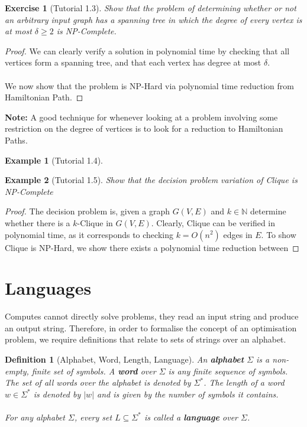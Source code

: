 \documentclass[a4paper,10pt]{article}
\newtheorem{definition}{Definition}
\newtheorem{exercise}{Exercise}
\newtheorem{example}{Example}
\begin{document}
\begin{exercise}[Tutorial 1.3]
    Show that the problem of determining whether or not an arbitrary input graph has a spanning tree in which the degree of every vertex is at most $\delta\geq2$ is NP-Complete.
\end{exercise}
\begin{proof}
    We can clearly verify a solution in polynomial time by checking that all vertices form a spanning tree, and that each vertex has degree at most $\delta$. \\
    \\
    We now show that the problem is NP-Hard via polynomial time reduction from Hamiltonian Path.
\end{proof}
\textbf{Note:} A good technique for whenever looking at a problem involving some restriction on the degree of vertices is to look for a reduction to Hamiltonian Paths.


\begin{example}[Tutorial 1.4]
\end{example}


\begin{example}[Tutorial 1.5] Show that the decision problem variation of Clique is NP-Complete
\end{example}
\begin{proof}
    The decision problem is, given a graph $G(V,E)$ and $k\in\mathbb{N}$ determine whether there is a $k$-Clique in $G(V,E)$. Clearly, Clique can be verified in polynomial time, as it corresponds to checking $k = O(n^2)$ edges in $E$. To show Clique is NP-Hard, we show there exists a polynomial time reduction between
\end{proof}


\newpage
\section{Languages}
Computes cannot directly solve problems, they read an input string and produce an output string. Therefore, in order to formalise the concept of an optimisation problem, we require definitions that relate to sets of strings over an alphabet. 

\begin{definition}[Alphabet, Word, Length, Language]
An \textbf{alphabet} $\Sigma$ is a non-empty, finite set of symbols. A \textbf{word} over $\Sigma$ is any finite sequence of symbols. The set of all words over the alphabet is denoted by $\Sigma^*$. The length of a word $w\in\Sigma^*$ is denoted by $|w|$ and is given by the number of symbols it contains. \\
\\
For any alphabet $\Sigma$, every set $L\subseteq\Sigma^*$ is called a \textbf{language} over $\Sigma$.
\end{definition}
\end{document}

